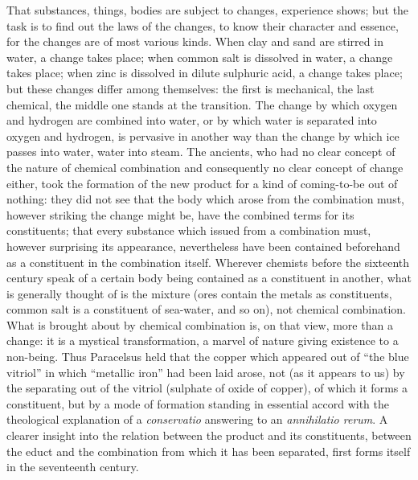 \documentclass[12pt,a4paper]{book}
\begin{document}
That substances, things, bodies are subject to changes, experience shows; but
the task is to find out the laws of the changes, to know their character and
essence, for the changes are of most various kinds. When clay and sand are
stirred in water, a change takes place; when common salt is dissolved in water,
a change takes place; when zinc is dissolved in dilute sulphuric acid, a change
takes place; but these changes differ among themselves: the first is
mechanical, the last chemical, the middle one stands at the transition. The
change by which oxygen and hydrogen are combined into water, or by which water
is separated into oxygen and hydrogen, is pervasive in another way than the
change
by which ice passes into water, water into steam. The ancients, who had no
clear concept of the nature of chemical combination and consequently no clear
concept of change either, took the formation of the new product for a kind of
coming-to-be out of nothing: they did not see that the body which arose from
the combination must, however striking the change might be, have the combined
terms for its constituents; that every substance which issued from a
combination must, however surprising its appearance, nevertheless have been
contained beforehand as a constituent in the combination itself. Wherever
chemists before the sixteenth century speak of a certain body being contained
as a constituent in another, what is generally thought of is the mixture (ores
contain the metals as constituents, common salt is a constituent of sea-water,
and so on), not chemical combination. What is brought about by chemical
combination is, on that view, more than a change: it is a mystical
transformation, a marvel of nature giving existence to a non-being. Thus
Paracelsus held that the copper which appeared out of ``the blue vitriol'' in
which ``metallic iron'' had been laid arose, not (as it appears to us) by the
separating out of the vitriol (sulphate of oxide of copper), of which it forms
a constituent, but by a mode of formation standing in essential accord with the
theological explanation of a \textit{conservatio} answering to an
\textit{annihilatio rerum}. A clearer insight into the relation between the
product and its constituents, between the educt and the combination from which
it has been separated, first forms itself in the seventeenth century.
\end{document}
